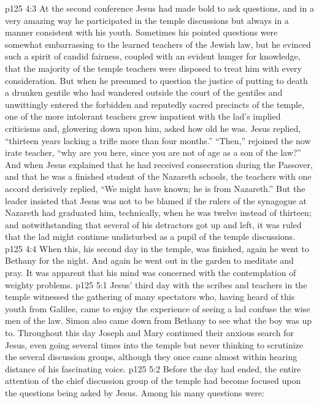 \vs p125 4:3 At the second conference Jesus had made bold to ask questions, and in a very amazing way he participated in the temple discussions but always in a manner consistent with his youth. Sometimes his pointed questions were somewhat embarrassing to the learned teachers of the Jewish law, but he evinced such a spirit of candid fairness, coupled with an evident hunger for knowledge, that the majority of the temple teachers were disposed to treat him with every consideration. But when he presumed to question the justice of putting to death a drunken gentile who had wandered outside the court of the gentiles and unwittingly entered the forbidden and reputedly sacred precincts of the temple, one of the more intolerant teachers grew impatient with the lad’s implied criticisms and, glowering down upon him, asked how old he was. Jesus replied, \textcolor{ubdarkred}{“thirteen years lacking a trifle more than four months.”} “Then,” rejoined the now irate teacher, “why are you here, since you are not of age as a son of the law?” And when Jesus explained that he had received consecration during the Passover, and that he was a finished student of the Nazareth schools, the teachers with one accord derisively replied, “We might have known; he is from Nazareth.” But the leader insisted that Jesus was not to be blamed if the rulers of the synagogue at Nazareth had graduated him, technically, when he was twelve instead of thirteen; and notwithstanding that several of his detractors got up and left, it was ruled that the lad might continue undisturbed as a pupil of the temple discussions.
\vs p125 4:4 When this, his second day in the temple, was finished, again he went to Bethany for the night. And again he went out in the garden to meditate and pray. It was apparent that his mind was concerned with the contemplation of weighty problems.
\vs p125 5:1 Jesus’ third day with the scribes and teachers in the temple witnessed the gathering of many spectators who, having heard of this youth from Galilee, came to enjoy the experience of seeing a lad confuse the wise men of the law. Simon also came down from Bethany to see what the boy was up to. Throughout this day Joseph and Mary continued their anxious search for Jesus, even going several times into the temple but never thinking to scrutinize the several discussion groups, although they once came almost within hearing distance of his fascinating voice.
\vs p125 5:2 Before the day had ended, the entire attention of the chief discussion group of the temple had become focused upon the questions being asked by Jesus. Among his many questions were:
